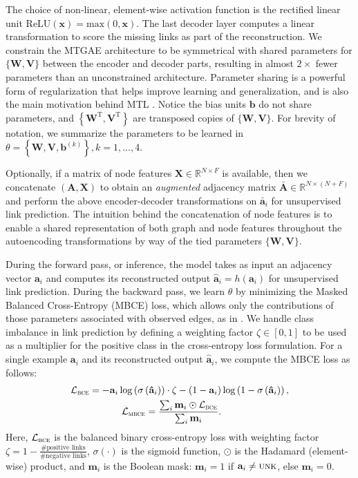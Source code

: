 \documentclass{article}
\begin{document}
The choice of non-linear, element-wise activation function is the rectified linear unit $\text{ReLU}(\mathbf{x}) = \text{max}(0, \mathbf{x})$. The last decoder layer computes a linear transformation to score the missing links as part of the reconstruction. We constrain the MTGAE architecture to be symmetrical with shared parameters for $\{\mathbf{W},\mathbf{V}\}$ between the encoder and decoder parts, resulting in almost $2\times$ fewer parameters than an unconstrained architecture. Parameter sharing is a powerful form of regularization that helps improve learning and generalization, and is also the main motivation behind MTL \cite{Caruana:1993, Yang:2017}. Notice the bias units $\mathbf{b}$ do not share parameters, and $\left\{\mathbf{W}^\text{T}, \mathbf{V}^\text{T}\right\}$ are transposed copies of $\{\mathbf{W}, \mathbf{V}\}$. For brevity of notation, we summarize the parameters to be learned in $\theta = \left\{\mathbf{W}, \mathbf{V}, \mathbf{b}^{(k)}\right\}, k=1,...,4$.

Optionally, if a matrix of node features $\mathbf{X} \in \mathbb{R}^{N \times F}$ is available, then we concatenate $(\mathbf{A},\mathbf{X})$ to obtain an \emph{augmented} adjacency matrix $\mathbf{\bar{A}} \in \mathbb{R}^{N \times (N + F)}$ and perform the above encoder-decoder transformations on $\mathbf{\bar{a}}_i$ for unsupervised link prediction. The intuition behind the concatenation of node features is to enable a shared representation of both graph and node features throughout the autoencoding transformations by way of the tied parameters $\{\mathbf{W},\mathbf{V}\}$.

During the forward pass, or inference, the model takes as input an adjacency vector $\mathbf{a}_i$ and computes its reconstructed output $\mathbf{\hat{a}}_i = h(\mathbf{a}_i)$ for unsupervised link prediction. During the backward pass, we learn $\theta$ by minimizing the Masked Balanced Cross-Entropy (MBCE) loss, which allows only the contributions of those parameters associated with observed edges, as in \cite{Kuchaiev:2017,Sedhain:2015}. We handle class imbalance in link prediction by defining a weighting factor $\zeta \in [0,1]$ to be used as a multiplier for the positive class in the cross-entropy loss formulation. For a single example $\mathbf{a}_i$ and its reconstructed output $\mathbf{\hat{a}}_i$, we compute the MBCE loss as follows:
\begin{align*}
\mathcal{L}_{\textsc{bce}} = -\mathbf{a}_i \log\left(\sigma\left(\mathbf{\hat{a}}_i\right)\right) \cdot \zeta - (1 - \mathbf{a}_i) &\log\left(1 - \sigma\left(\mathbf{\hat{a}}_i\right)\right), \\
\mathcal{L}_{\textsc{mbce}} = \frac{\sum_i \mathbf{m}_i \odot \mathcal{L}_{\textsc{bce}}} {\sum_i \mathbf{m}_i}.
\end{align*}
Here, $\mathcal{L}_{\textsc{bce}}$ is the balanced binary cross-entropy loss with weighting factor $\zeta = 1 - \frac{\text{\# positive links}}{\text{\# negative links}}$, $\sigma(\cdot)$ is the sigmoid function, $\odot$ is the Hadamard (element-wise) product,  and $\mathbf{m}_i$ is the Boolean mask: $\mathbf{m}_i = 1$  if $\mathbf{a}_i \neq \textsc{unk}$, else $\mathbf{m}_i = 0$.
\end{document}
